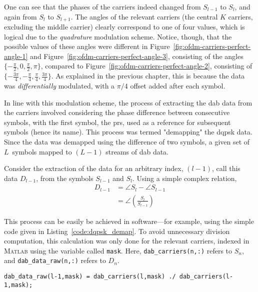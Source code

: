 \documentclass[class=report,11pt,crop=false]{standalone}
\begin{document}
One can see that the phases of the carriers indeed changed from \(S_{l-1}\) to \(S_{l}\), and again from \(S_{l}\) to \(S_{l+1}\). The angles of the relevant carriers (the central \(K\) carriers, excluding the middle carrier) clearly correspond to one of four values, which is logical due to the \emph{quadrature} modulation scheme. Notice, though, that the possible values of these angles were different in Figure~\ref{fig:ofdm-carriers-perfect-angle-1} and Figure~\ref{fig:ofdm-carriers-perfect-angle-3}, consisting of the angles \(\{-\frac{\pi}{2}, 0, \frac{\pi}{2}, \pi\}\), compared to Figure~\ref{fig:ofdm-carriers-perfect-angle-2}, consisting of \(\{-\frac{3\pi}{4}, -\frac{\pi}{4},\frac{\pi}{4}, \frac{3\pi}{4}\}\). As explained in the previous chapter, this is because the data was \emph{differentially} modulated, with a \(\pi/4\) offset added after each symbol.

In line with this modulation scheme, the process of extracting the \gls{dab} data from the carriers involved considering the phase difference between consecutive symbols, with the first symbol, the \gls{prs}, used as a reference for subsequent symbols (hence its name). This process was termed "demapping" the \gls{dqpsk} data. Since the data was demapped using the difference of two symbols, a given set of \(L\)~symbols mapped to \((L-1)\) streams of \gls{dab} data.

Consider the extraction of the data for an arbitrary index, \((l-1)\), call this data \(D_{l-1}\), from the symbols \(S_{l-1}\) and \(S_{l}\). Using a simple complex relation,
\begin{align}
  D_{l-1} &= \angle S_{l} - \angle S_{l-1}\\
          &= \angle\left(\frac{S_{l}}{S_{l-1}}\right)
\end{align}

This process can be easily be achieved in software---for example, using the simple code given in Listing~\ref{code:dqpsk_demap}. To avoid unnecessary division computation, this calculation was only done for the relevant carriers, indexed in \textsc{Matlab} using the variable called \texttt{mask}. Here, \texttt{dab\_carriers(n,:)} refers to \(S_n\), and \texttt{dab\_data\_raw(n,:)} refers to \(D_n\).

\begin{lstlisting}[caption={\textsc{Matlab} code for demapping \gls{dab} carriers into \gls{dqpsk} data},label={code:dqpsk_demap}]
dab_data_raw(l-1,mask) = dab_carriers(l,mask) ./ dab_carriers(l-1,mask);
\end{lstlisting}
\end{document}
